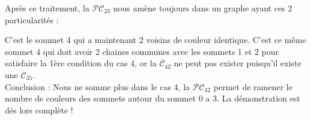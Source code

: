 \documentclass[french]{report}
\begin{document}
\begin{description}
Après ce traitement, la ${\mathcal{PC}}_{23}$ nous amène toujours dans un graphe ayant ces 2 particularités :\

C’est le sommet 4 qui a maintenant 2 voisins de couleur identique. C’est ce même sommet 4
qui doit avoir 2 chaines communes avec les sommets 1 et 2 pour satisfaire la 1ère condition du cas 4, or la $\overline{\mathcal{C}}_{42}$ ne peut pas exister puisqu’il existe une $\overline{\mathcal{C}}_{35}$.\\

Conclusion : Nous ne somme plus dans le cas 4, la ${\mathcal{PC}}_{42}$ permet de ramener le nombre de couleurs des sommets autour du sommet 0 a 3. 
La démonstration est dés lors complète !
\end{description}












\end{document}
